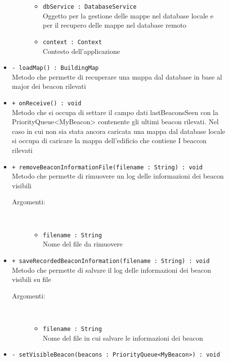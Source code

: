 \documentclass[../DefinizioneDiProdotto.tex]{subfiles}
\begin{document}
\begin{description}
\begin{itemize}
\begin{description}
\begin{itemize}
\item \texttt{dbService : DatabaseService}\\
Oggetto per la gestione delle mappe nel database locale e per il recupero delle mappe nel database remoto\item \texttt{context : Context}\\
Contesto dell'applicazione\end{itemize}
\end{description}
\item \texttt{- loadMap() : BuildingMap}\\
Metodo che permette di recuperare una mappa dal database in base al major dei beacon rilevati
 \item \texttt{+ onReceive() : void}\\
Metodo che si occupa di settare il campo dati lastBeaconsSeen con la PriorityQueue<MyBeacon> contenente gli ultimi beacon rilevati. Nel caso in cui non sia stata ancora caricata una mappa dal database locale si occupa di caricare la mappa dell'edificio che contiene I beaccon rilevati
 \item \texttt{+ removeBeaconInformationFile(filename : String) : void}\\
Metodo che permette di rimuovere un log delle informazioni dei beacon visibili
 \begin{description}
\item[Argomenti:] \
\begin{itemize}
\item \texttt{filename : String}\\
Nome del file da rimuovere\end{itemize}
\end{description}
\item \texttt{+ saveRecordedBeaconInformation(filename : String) : void}\\
Metodo che permette di salvare il log delle informazioni dei beacon visibili su file
 \begin{description}
\item[Argomenti:] \
\begin{itemize}
\item \texttt{filename : String}\\
Nome del file in cui salvare le informazioni dei beacon\end{itemize}
\end{description}
\item \texttt{- setVisibleBeacon(beacons : PriorityQueue<MyBeacon>) : void}\\

\end{itemize}
\end{description}
\end{document}
